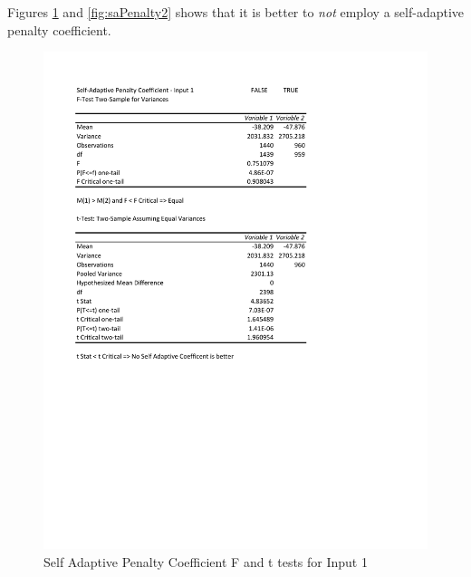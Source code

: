 \documentclass[times]{article}
\begin{document}
	Figures \ref{fig:saPenalty1} and \ref{fig:saPenalty2} shows that it is better to \textit{not} employ a self-adaptive penalty coefficient.

	\begin{figure}
		\caption{Self Adaptive Penalty Coefficient F and t tests for Input 1}
		\label{fig:saPenalty1}
		\includegraphics[width=\textwidth]{./t_test/S-APenaltyCoeff1}
	\end{figure}
\end{document}
